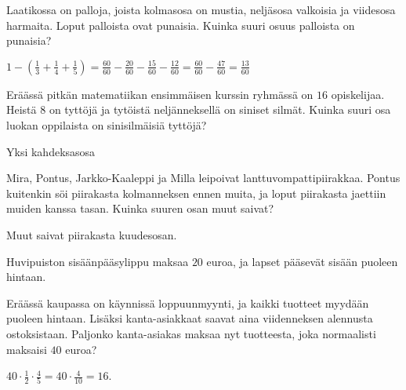 \begin{tehtavasivu}

\begin{tehtava} 
        Laatikossa on palloja, joista kolmasosa on mustia, neljäsosa valkoisia ja viidesosa harmaita. Loput palloista ovat punaisia. Kuinka suuri osuus palloista on punaisia?
        \begin{vastaus}
            $1-(\frac{1}{3}+\frac{1}{4}+\frac{1}{5})
            = \frac{60}{60}-\frac{20}{60}-\frac{15}{60}-\frac{12}{60}
            = \frac{60}{60}-\frac{47}{60}
            = \frac{13}{60}$
        \end{vastaus}
    \end{tehtava}
    
\begin{tehtava} 
Eräässä pitkän matematiikan ensimmäisen kurssin ryhmässä on $16$ opiskelijaa. Heistä $8$ on tyttöjä ja tytöistä neljänneksellä on siniset silmät. Kuinka suuri osa luokan oppilaista on sinisilmäisiä tyttöjä?
        \begin{vastaus}
			Yksi kahdeksasosa
        \end{vastaus}
\end{tehtava}


\begin{tehtava}
        Mira, Pontus, Jarkko-Kaaleppi ja Milla leipoivat lanttuvompattipiirakkaa. Pontus kuitenkin söi piirakasta kolmanneksen ennen muita, ja loput piirakasta jaettiin muiden kanssa tasan. Kuinka suuren osan muut saivat?
        \begin{vastaus}
            Muut saivat piirakasta kuudesosan.
        \end{vastaus}
\end{tehtava}
    
\begin{tehtava}
    Huvipuiston sisäänpääsylippu maksaa $20$ euroa, ja lapset pääsevät sisään puoleen hintaan.
    \begin{vastaus}
    \end{vastaus}
\end{tehtava}  

\begin{tehtava}
	Eräässä kaupassa on käynnissä loppuunmyynti, ja kaikki tuotteet myydään puoleen hintaan. Lisäksi kanta-asiakkaat saavat aina viidenneksen alennusta ostoksistaan. Paljonko kanta-asiakas maksaa nyt tuotteesta, joka normaalisti maksaisi $40$ euroa?
    \begin{vastaus}
		$40\cdot \frac{1}{2} \cdot \frac{4}{5}=40\cdot \frac{4}{10}= 16$. 
	\end{vastaus}
\end{tehtava}
    

\end{tehtavasivu}
